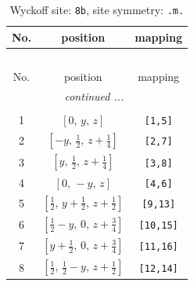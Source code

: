 \documentclass[fleqn,8pt]{jsarticle}
\begin{document}
\begin{longtable}{ccc}
\caption{Wyckoff site: {\tt 8b}, site symmetry: {\tt .m.}}
 \\
 \hline \hline
No. & position & mapping \\ \hline \endfirsthead

\multicolumn{2}{l}{\tablename\ \thetable{}} \\
 \hline \hline
No. & position & mapping \\ \hline \endhead

 \hline \hline
\multicolumn{2}{r}{\footnotesize\it continued ...} \\ \endfoot

 \hline \hline
\multicolumn{2}{r}{} \\ \endlastfoot

1 & $\left[ 0,\, y,\, z \right]$ & {\tt [1,5]} \\ \hline
2 & $\left[ - y,\, \frac{1}{2},\, z + \frac{1}{4} \right]$ & {\tt [2,7]} \\ \hline
3 & $\left[ y,\, \frac{1}{2},\, z + \frac{1}{4} \right]$ & {\tt [3,8]} \\ \hline
4 & $\left[ 0,\, - y,\, z \right]$ & {\tt [4,6]} \\ \hline
5 & $\left[ \frac{1}{2},\, y + \frac{1}{2},\, z + \frac{1}{2} \right]$ & {\tt [9,13]} \\ \hline
6 & $\left[ \frac{1}{2} - y,\, 0,\, z + \frac{3}{4} \right]$ & {\tt [10,15]} \\ \hline
7 & $\left[ y + \frac{1}{2},\, 0,\, z + \frac{3}{4} \right]$ & {\tt [11,16]} \\ \hline
8 & $\left[ \frac{1}{2},\, \frac{1}{2} - y,\, z + \frac{1}{2} \right]$ & {\tt [12,14]} \\
\end{longtable}
\renewcommand{\arraystretch}{1.2}
\end{document}
